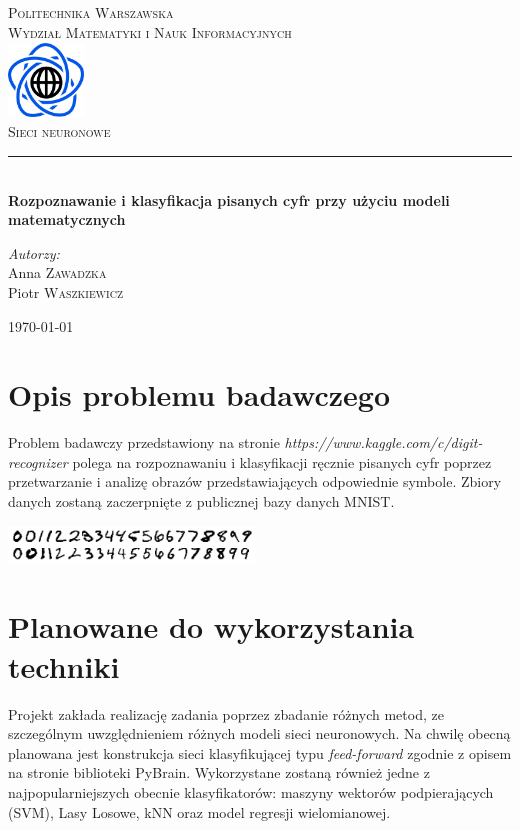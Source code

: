 \documentclass{article}
\begin{document}
\begin{titlepage}
\newcommand{\HRule}{\rule{\linewidth}{0.5mm}}
\begin{center}
\textsc{\LARGE Politechnika Warszawska}\\[0.5cm]
\textsc{\Large Wydział Matematyki i Nauk Informacyjnych}\\[1cm]
\includegraphics[width=2cm, height=2cm]{logo}\\[1cm]
\textsc{\Huge Sieci neuronowe}\\[0.5cm]
\HRule \\[0.4cm]
{ \LARGE \bfseries Rozpoznawanie i klasyfikacja pisanych cyfr przy użyciu modeli matematycznych}\\[4cm]
\begin{flushright}
\Large \emph{Autorzy:}\\[0.5cm]
Anna \textsc{Zawadzka}\\
Piotr \textsc{Waszkiewicz}\\[2.5cm]
\end{flushright} 
\vfill
{\large \today}\\[1cm]	
\end{center}
\end{titlepage}

\newpage
\section{Opis problemu badawczego}
Problem badawczy przedstawiony na stronie \textit{https://www.kaggle.com/c/digit-recognizer} polega na rozpoznawaniu i klasyfikacji ręcznie pisanych cyfr poprzez przetwarzanie i analizę obrazów przedstawiających odpowiednie symbole. Zbiory danych zostaną zaczerpnięte z publicznej bazy danych  MNIST\cite{mnist_database}. 
\begin{center}
\includegraphics[width=0.49\textwidth]{native}
\end{center}

\section{Planowane do wykorzystania techniki}
Projekt zakłada realizację zadania poprzez zbadanie różnych metod, ze szczególnym uwzględnieniem różnych modeli sieci neuronowych. Na chwilę obecną planowana jest konstrukcja sieci klasyfikującej typu \textit{feed-forward} zgodnie z opisem na stronie biblioteki PyBrain\cite{pybrain}. Wykorzystane zostaną również jedne z najpopularniejszych obecnie klasyfikatorów: maszyny wektorów podpierających (SVM)\cite{CortesVapnik1995}, Lasy Losowe\cite{RF}, kNN\cite{Altman1992} oraz model regresji wielomianowej. \\
\end{document}
